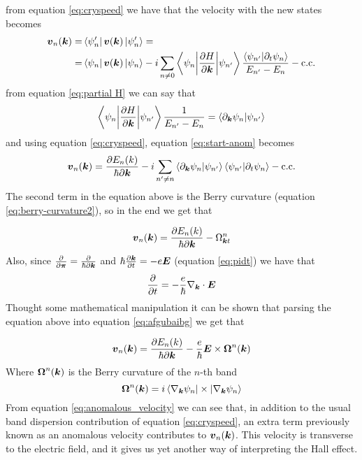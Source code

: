 from equation \ref{eq:cryspeed} we have that the velocity with the new states becomes 
\begin{equation}
    \begin{split}
        \boldsymbol{v}_n(\boldsymbol{k})=&\bra{\psi'_n}\boldsymbol{v}(\boldsymbol{k})\ket{\psi'_n}=\\
        =&\bra{\psi_n}\boldsymbol{v}(\boldsymbol{k})\ket{\psi_n} -i\sum _{n\neq 0}
        \braket{\psi_n\bigg|\frac{\partial H}{\partial \boldsymbol{k} }}{\psi_{n'}}
        \frac{\braket{\psi_{n'}}{\partial_t\psi_n}}{E_{n'}-E_n} - \textrm {c.c.}
    \end{split}
    \label{eq:start-anom}
\end{equation}
from equation \ref{eq:partial H} we can say that
\begin{equation}
    \braket{\psi_n\bigg|\frac{\partial H}{\partial \boldsymbol{k} }}{\psi_{n'}}\frac1{E_{n'}-E_n}=\braket{\partial_{\boldsymbol{k}}\psi_n}{\psi_{n'}}
\end{equation}
and using equation \ref{eq:cryspeed}, equation \ref{eq:start-anom} becomes
\begin{equation}
    \boldsymbol{v}_n(\boldsymbol{k})=\frac{\partial E_n (k)}{\hbar\partial \boldsymbol{k}} -i
    \sum_{n'\neq n}
    \braket{\partial_{\boldsymbol{k}}\psi_n}{\psi_{n'}}
    \braket{\psi_{n'}}{\partial_t\psi_n}
    -\textrm{c.c.}
\end{equation}
The second term in the equation above is the Berry curvature (equation \ref{eq:berry-curvature2}), so in the end we get that

\begin{equation}
    \boldsymbol{v}_n(\boldsymbol{k})=\frac{\partial E_n (k)}{\hbar\partial \boldsymbol{k}} -\Omega^n_{\boldsymbol{k}t}
    \label{eq:afgubaibg}
\end{equation}
Also, since $\frac{\partial}{\partial \boldsymbol{\pi}}=\frac \partial{\hbar\partial \boldsymbol{k}}$ and $\hbar\frac{\partial \boldsymbol{k}}{\partial t}=-e\boldsymbol{E}$ (equation \ref{eq:pidt})
we have that
\[
    \frac{\partial }{\partial t}=-\frac e\hbar \nabla_{\boldsymbol{k}}\cdot \boldsymbol{E}    
\]
Thought some mathematical manipulation it can be shown that parsing the equation above into equation \ref{eq:afgubaibg} we get that

\begin{equation}
    \boldsymbol{v}_n(\boldsymbol{k})=\frac{\partial E_n (k)}{\hbar\partial \boldsymbol{k}} -\frac e\hbar \boldsymbol{E}\times \boldsymbol{\Omega}^n(\boldsymbol{k})
    \label{eq:anomalous_velocity}
\end{equation}
Where $\boldsymbol{\Omega}^n(\boldsymbol{k})$ is the Berry curvature of the $n$-th band 
\begin{equation}
    \boldsymbol{\Omega}^n(\boldsymbol{k})=i\bra{\nabla_{\boldsymbol{k}}\psi_n}\times \ket{\nabla_{\boldsymbol{k}}\psi_n}      
\end{equation}
From equation \ref{eq:anomalous_velocity} we can see that, in addition to the usual band dispersion contribution of equation \ref{eq:cryspeed}, an extra term previously known as an anomalous velocity contributes to $\boldsymbol{v}_n(\boldsymbol{k})$. This velocity is transverse to the electric field, and it gives us yet another way of interpreting the Hall effect.


